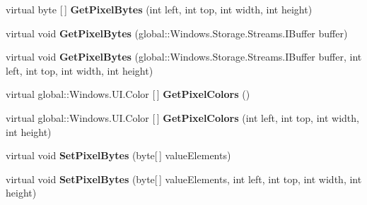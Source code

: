 \begin{DoxyCompactItemize}
virtual byte \mbox{[}$\,$\mbox{]} {\bfseries Get\+Pixel\+Bytes} (int left, int top, int width, int height)
\item 
\mbox{\label{class_microsoft_1_1_graphics_1_1_canvas_1_1_canvas_bitmap_ade52a41619a9c12e9ce62dcd2b20b49a}} 
virtual void {\bfseries Get\+Pixel\+Bytes} (global\+::\+Windows.\+Storage.\+Streams.\+I\+Buffer buffer)
\item 
\mbox{\label{class_microsoft_1_1_graphics_1_1_canvas_1_1_canvas_bitmap_a21ee46d7600c31134f3206d95f5cf889}} 
virtual void {\bfseries Get\+Pixel\+Bytes} (global\+::\+Windows.\+Storage.\+Streams.\+I\+Buffer buffer, int left, int top, int width, int height)
\item 
\mbox{\label{class_microsoft_1_1_graphics_1_1_canvas_1_1_canvas_bitmap_a6c2a44ea43b2b07fc29fedf98121c32b}} 
virtual global\+::\+Windows.\+U\+I.\+Color \mbox{[}$\,$\mbox{]} {\bfseries Get\+Pixel\+Colors} ()
\item 
\mbox{\label{class_microsoft_1_1_graphics_1_1_canvas_1_1_canvas_bitmap_ac1225cec2ca697896c39a4a3fd428764}} 
virtual global\+::\+Windows.\+U\+I.\+Color \mbox{[}$\,$\mbox{]} {\bfseries Get\+Pixel\+Colors} (int left, int top, int width, int height)
\item 
\mbox{\label{class_microsoft_1_1_graphics_1_1_canvas_1_1_canvas_bitmap_afa559f4f10d6530ca2210a5f74697ab4}} 
virtual void {\bfseries Set\+Pixel\+Bytes} (byte\mbox{[}$\,$\mbox{]} value\+Elements)
\item 
\mbox{\label{class_microsoft_1_1_graphics_1_1_canvas_1_1_canvas_bitmap_ae12ac6b70709680b8e6f22865d9114e7}} 
virtual void {\bfseries Set\+Pixel\+Bytes} (byte\mbox{[}$\,$\mbox{]} value\+Elements, int left, int top, int width, int height)
\item 
\mbox{\label{class_microsoft_1_1_graphics_1_1_canvas_1_1_canvas_bitmap_a2315a548e9eef8c897f68de3d4703363}} 

\end{DoxyCompactItemize}
